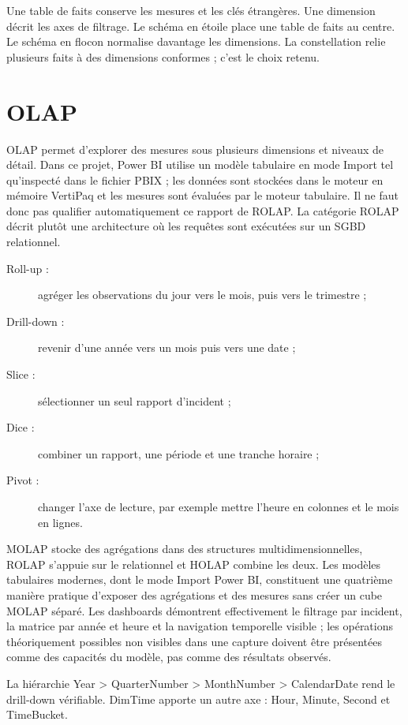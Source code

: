 Une table de faits conserve les mesures et les clés étrangères. Une dimension décrit les axes de filtrage. Le schéma en étoile place une table de faits au centre. Le schéma en flocon normalise davantage les dimensions. La constellation relie plusieurs faits à des dimensions conformes ; c'est le choix retenu.

\section{OLAP}
OLAP permet d'explorer des mesures sous plusieurs dimensions et niveaux de détail. Dans ce projet, Power BI utilise un modèle tabulaire en mode Import tel qu'inspecté dans le fichier PBIX ; les données sont stockées dans le moteur en mémoire VertiPaq et les mesures sont évaluées par le moteur tabulaire. Il ne faut donc pas qualifier automatiquement ce rapport de ROLAP. La catégorie ROLAP décrit plutôt une architecture où les requêtes sont exécutées sur un SGBD relationnel.
\begin{description}
\item[Roll-up :] agréger les observations du jour vers le mois, puis vers le trimestre ;
\item[Drill-down :] revenir d'une année vers un mois puis vers une date ;
\item[Slice :] sélectionner un seul rapport d'incident ;
\item[Dice :] combiner un rapport, une période et une tranche horaire ;
\item[Pivot :] changer l'axe de lecture, par exemple mettre l'heure en colonnes et le mois en lignes.
\end{description}
MOLAP stocke des agrégations dans des structures multidimensionnelles, ROLAP s'appuie sur le relationnel et HOLAP combine les deux. Les modèles tabulaires modernes, dont le mode Import Power BI, constituent une quatrième manière pratique d'exposer des agrégations et des mesures sans créer un cube MOLAP séparé. Les dashboards démontrent effectivement le filtrage par incident, la matrice par année et heure et la navigation temporelle visible ; les opérations théoriquement possibles non visibles dans une capture doivent être présentées comme des capacités du modèle, pas comme des résultats observés.

\begin{pedagogie}
La hiérarchie Year > QuarterNumber > MonthNumber > CalendarDate rend le drill-down vérifiable. DimTime apporte un autre axe : Hour, Minute, Second et TimeBucket.
\end{pedagogie}

